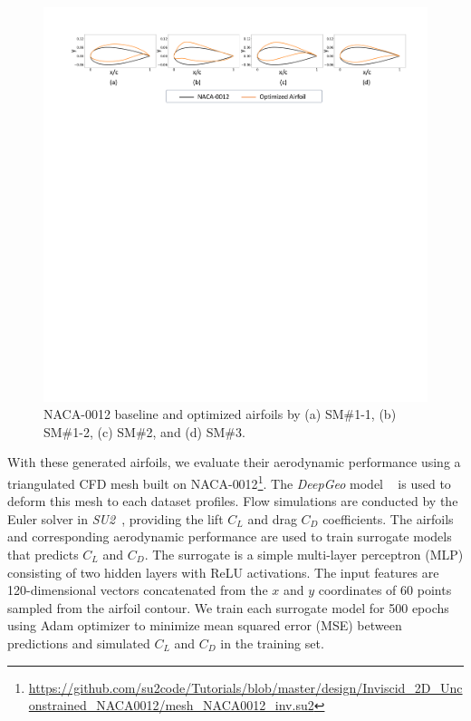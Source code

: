 \begin{figure}[!h]
    \begin{center}
        \includegraphics[width=1\linewidth]{chapter6/fig/SBO_optim_airfoil.pdf}
    \end{center}
    \caption{
        \small NACA-0012 baseline and optimized airfoils by (a) SM\#1-1, (b) SM\#1-2, (c) SM\#2, and (d) SM\#3.
    }
    \label{ch6:fig:main_SBO_optimized_airfoils}
\end{figure}

With these generated airfoils, we evaluate their aerodynamic performance using a triangulated CFD mesh built on NACA-0012\footnote{\scriptsize\url{https://github.com/su2code/Tutorials/blob/master/design/Inviscid_2D_Unconstrained_NACA0012/mesh_NACA0012_inv.su2}}. The \textit{DeepGeo} model ~\cite{aa.Wei2023b,aa.Wei2024b,aa.Wei2025} is used to deform this mesh to each dataset profiles. Flow simulations are conducted by the Euler solver in \textit{SU2}~\cite{aa.Economon2016}, providing the lift $C_L$ and drag $C_D$ coefficients. The airfoils and corresponding aerodynamic performance are used to train surrogate models that predicts $C_L$ and $C_D$. The surrogate is a simple multi-layer perceptron (MLP) consisting of two hidden layers with ReLU activations. The input features are 120-dimensional vectors concatenated from the $x$ and $y$ coordinates of $60$ points sampled from the airfoil contour. We train each surrogate model for 500 epochs using Adam optimizer to minimize mean squared error (MSE) between predictions and simulated $C_L$ and $C_D$ in the training set.


